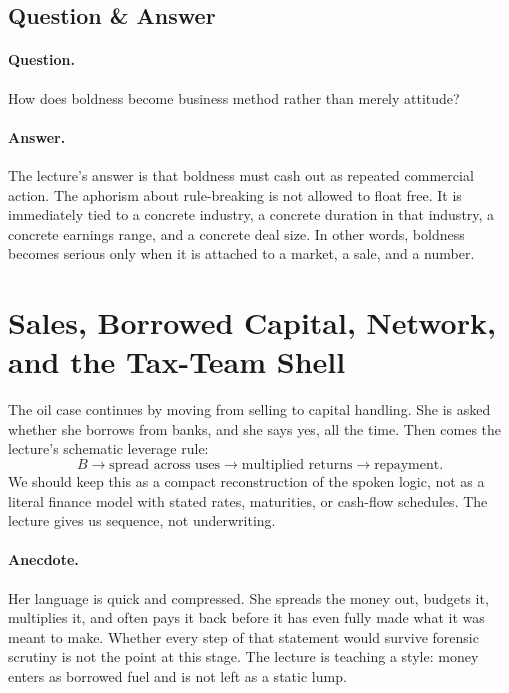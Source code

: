 \subsection{Question \& Answer}

\paragraph{Question.}
How does boldness become business method rather than merely attitude?

\paragraph{Answer.}
The lecture's answer is that boldness must cash out as repeated commercial action. The aphorism about rule-breaking is not allowed to float free. It is immediately tied to a concrete industry, a concrete duration in that industry, a concrete earnings range, and a concrete deal size. In other words, boldness becomes serious only when it is attached to a market, a sale, and a number.

\section{Sales, Borrowed Capital, Network, and the Tax-Team Shell}

The oil case continues by moving from selling to capital handling. She is asked whether she borrows from banks, and she says yes, all the time. Then comes the lecture's schematic leverage rule:
\begin{equation}
B
\to
\text{spread across uses}
\to
\text{multiplied returns}
\to
\text{repayment}.
\end{equation}
We should keep this as a compact reconstruction of the spoken logic, not as a literal finance model with stated rates, maturities, or cash-flow schedules. The lecture gives us sequence, not underwriting.

\paragraph{Anecdote.}
Her language is quick and compressed. She spreads the money out, budgets it, multiplies it, and often pays it back before it has even fully made what it was meant to make. Whether every step of that statement would survive forensic scrutiny is not the point at this stage. The lecture is teaching a style: money enters as borrowed fuel and is not left as a static lump.

